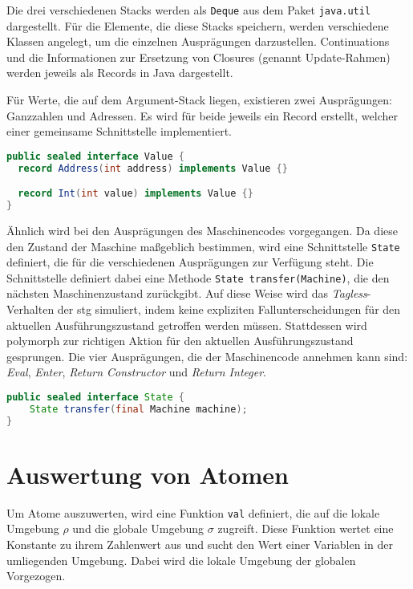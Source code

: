Die drei verschiedenen Stacks werden als \texttt{Deque} aus dem Paket \texttt{java.util} dargestellt.
Für die Elemente, die diese Stacks speichern, werden verschiedene Klassen angelegt, um die einzelnen Ausprägungen darzustellen.
Continuations und die Informationen zur Ersetzung von Closures (genannt Update-Rahmen) werden jeweils als Records in Java dargestellt.

Für Werte, die auf dem Argument-Stack liegen, existieren zwei Ausprägungen: Ganzzahlen und Adressen.
Es wird für beide jeweils ein Record erstellt, welcher einer gemeinsame Schnittstelle implementiert.

\begin{lstlisting}[language=java, morekeywords={record, sealed}, caption={Darstellung von Werten in Java}, label={lst:value}]
public sealed interface Value {
  record Address(int address) implements Value {}

  record Int(int value) implements Value {}
}
\end{lstlisting}

Ähnlich wird bei den Ausprägungen des Maschinencodes vorgegangen.
Da diese den Zustand der Maschine maßgeblich bestimmen, wird eine Schnittstelle \texttt{State} definiert, die für die verschiedenen Ausprägungen zur Verfügung steht.
Die Schnittstelle definiert dabei eine Methode \texttt{State transfer(Machine)}, die den nächsten Maschinenzustand zurückgibt.
Auf diese Weise wird das \textit{Tagless}-Verhalten der \gls{stg} simuliert, indem keine expliziten Fallunterscheidungen für den aktuellen Ausführungszustand getroffen werden müssen.
Stattdessen wird polymorph zur richtigen Aktion für den aktuellen Ausführungszustand gesprungen.
Die vier Ausprägungen, die der Maschinencode annehmen kann sind: \textit{Eval}, \textit{Enter}, \textit{Return Constructor} und \textit{Return Integer}.


\begin{lstlisting}[language=java, morekeywords={record, sealed}, caption={Schnittstelle für die Ausprägungen des Maschinencodes}, label={lst:code}]
public sealed interface State {
    State transfer(final Machine machine);
}
\end{lstlisting}


\section{Auswertung von Atomen}

Um Atome auszuwerten, wird eine Funktion \texttt{val} definiert, die auf die lokale Umgebung $\rho$ und die globale Umgebung $\sigma$ zugreift.
Diese Funktion wertet eine Konstante zu ihrem Zahlenwert aus und sucht den Wert einer Variablen in der umliegenden Umgebung.
Dabei wird die lokale Umgebung der globalen Vorgezogen.

